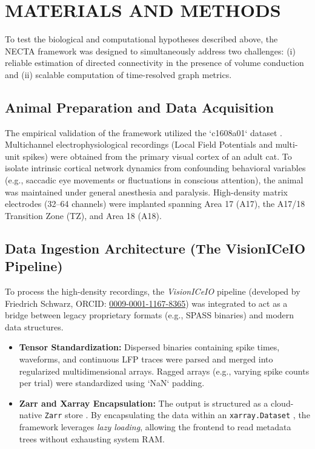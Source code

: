 \chapter{MATERIALS AND METHODS}

To test the biological and computational hypotheses described above, the NECTA framework was designed to simultaneously address two challenges: (i) reliable estimation of directed connectivity in the presence of volume conduction and (ii) scalable computation of time-resolved graph metrics.

\section{Animal Preparation and Data Acquisition}
The empirical validation of the framework utilized the `c1608a01` dataset \cite{wunderle2013}. Multichannel electrophysiological recordings (Local Field Potentials and multi-unit spikes) were obtained from the primary visual cortex of an adult cat. To isolate intrinsic cortical network dynamics from confounding behavioral variables (e.g., saccadic eye movements or fluctuations in conscious attention), the animal was maintained under general anesthesia and paralysis. High-density matrix electrodes (32–64 channels) were implanted spanning Area 17 (A17), the A17/18 Transition Zone (TZ), and Area 18 (A18). 

\section{Data Ingestion Architecture (The VisionICeIO Pipeline)}
To process the high-density recordings, the \textit{VisionICeIO} pipeline \cite{visioniceio2024} (developed by Friedrich Schwarz, ORCID: \href{https://orcid.org/0009-0001-1167-8365}{0009-0001-1167-8365}) was integrated to act as a bridge between legacy proprietary formats (e.g., SPASS binaries) and modern data structures. 
\begin{itemize}
\item \textbf{Tensor Standardization:} Dispersed binaries containing spike times, waveforms, and continuous LFP traces were parsed and merged into regularized multidimensional arrays. Ragged arrays (e.g., varying spike counts per trial) were standardized using `NaN` padding.
\item \textbf{Zarr and Xarray Encapsulation:} The output is structured as a cloud-native \texttt{Zarr} store \cite{zarr2020}. By encapsulating the data within an \texttt{xarray.Dataset} \cite{hoyer2017xarray}, the framework leverages \textit{lazy loading}, allowing the frontend to read metadata trees without exhausting system RAM.
\end{itemize}

